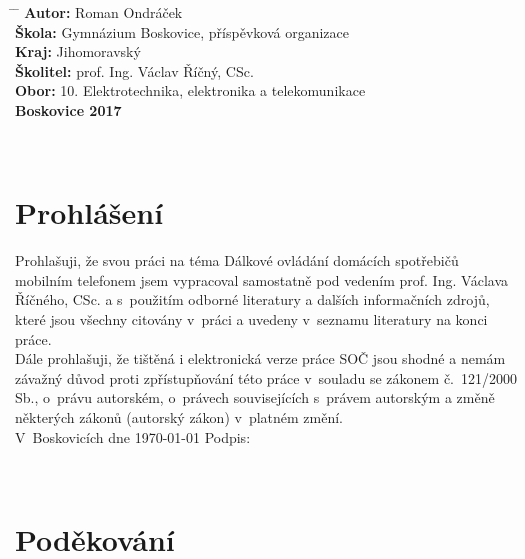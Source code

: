 \documentclass[12pt,a4paper,oneside]{article}
\begin{document}
\begin{tabbing}
\hspace{4mm} \= \hspace{24mm} \= \kill
\> \large \textbf{Autor:}     \> \large{Roman Ondráček}                                    \\[4mm]
\> \large \textbf{Škola:}     \> \large{Gymnázium Boskovice, příspěvková organizace}       \\[4mm]
\> \large \textbf{Kraj:}      \> \large{Jihomoravský}                                      \\[4mm]
\> \large \textbf{Školitel:}  \> \large{prof. Ing. Václav Říčný, CSc.}                     \\[4mm]
\> \large \textbf{Obor:}      \> \large{10. Elektrotechnika, elektronika a telekomunikace} \\[16mm]
\> \large \textbf{Boskovice 2017}
\end{tabbing}

\normalsize

\newpage

~ \vspace{88mm}

\section*{Prohlášení}

Prohlašuji, že svou práci na téma Dálkové ovládání domácích spotřebičů mobilním telefonem jsem vypracoval samostatně pod vedením prof. Ing. Václava Říčného, CSc. a s~použitím odborné literatury a dalších informačních zdrojů, které jsou všechny citovány v~práci a uvedeny v~seznamu literatury na konci práce. \\
Dále prohlašuji, že tištěná i elektronická verze práce SOČ jsou shodné a nemám závažný důvod proti zpřístupňování této práce v~souladu se zákonem č.~121/2000 Sb., o~právu autorském, o~právech souvisejících s~právem autorským a změně některých zákonů (autorský zákon) v~platném změní. \\[8mm]
V~Boskovicích dne \today \hspace{24mm} Podpis: 

\newpage

~ \vspace{80mm}

\section*{Poděkování}
\end{document}
